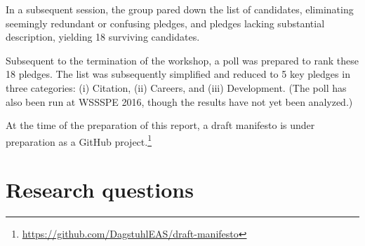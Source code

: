 \documentclass[a4paper,UKenglish]{dagrep}
\begin{document}
In a subsequent session, the group pared down the list of candidates, eliminating seemingly redundant or confusing pledges, and pledges lacking substantial description, yielding 18 surviving candidates.

Subsequent to the termination of the workshop, a poll was prepared to rank these 18 pledges. The list was subsequently simplified and reduced to 5 key pledges in three categories: (i) Citation, (ii) Careers, and (iii) Development.
(The poll has also been run at WSSSPE 2016, though the results have not yet been analyzed.)

At the time of the preparation of this report, a draft manifesto is under preparation as a GitHub project.\footnote{\url{https://github.com/DagstuhlEAS/draft-manifesto}}




\section{Research questions}



\end{document}
